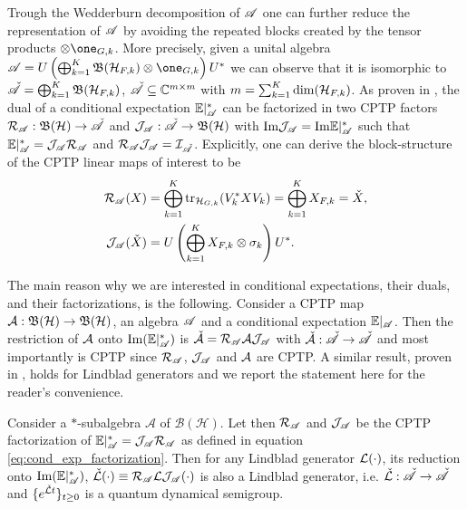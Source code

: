 \documentclass[aihp,12pt]{imsart}
\begin{document}
Trough the Wedderburn decomposition of $\mathscr{A}$ one can further reduce the representation of $\mathscr{A}$ by avoiding the repeated blocks created by the tensor products $\otimes\one_{G,k}$. More precisely, given a unital algebra $\As= U\left(\bigoplus_{k=1}^K \Bf(\Hc_{F,k}) \otimes \one_{G,k}\right)U^*$ 
we can observe that it is isomorphic to $\check{\mathscr{A}} = \bigoplus_{k=1}^K \mathfrak{B}(\mathcal{H}_{F,k})$, $\check{\mathscr{A}}\subseteq \mathbb{C}^{m\times m}$ with $m=\sum_{k=1}^K \dim(\mathcal{H}_{F,k})$. 
As proven in \cite[Theorem 1]{tit2023}, the dual of a conditional expectation $\mathbb{E}|_{\mathscr{A}}^*$ can be factorized in two CPTP factors $\mathcal{R}_{\mathscr{A}}:\mathfrak{B}(\mathcal{H})\to\check{\mathscr{A}}$ and $\mathcal{J}_{\mathscr{A}}: \check{\mathscr{A}}\to\mathfrak{B}(\mathcal{H})$ with ${\rm Im}\mathcal{J}_{\mathscr{A}} = {\rm Im}\mathbb{E}|_{\mathscr{A}}^*$ such that $\mathbb{E}|_{\mathscr{A}}^* = \mathcal{J}_{\mathscr{A}}\mathcal{R}_{\mathscr{A}}$ and $\mathcal{R}_{\mathscr{A}}\mathcal{J}_{\mathscr{A}} = \mathcal{I}_{\check{\mathscr{A}}}$.
Explicitly, one can derive the block-structure of the CPTP  linear maps of interest to be 
\begin{equation}
\begin{split}
    \mathcal{R}_{\mathscr{A}}(X) &=\bigoplus_{k=1}^K {\rm tr}_{\mathcal{H}_{G,k}}(V_k^* X V_k)=\bigoplus_{k=1}^K X_{F,k}=\check X,\\
    \mathcal{J}_{\mathscr{A}}(\check X)&=U\left(\bigoplus_{k=1}^K X_{F,k} \otimes\sigma_{k}\right)U^*.
\end{split}
    \label{eq:cond_exp_factorization}
\end{equation}

The main reason why we are interested in conditional expectations, their duals, and their factorizations, is the following. Consider a CPTP map $\mathcal{A}:\mathfrak{B}(\mathcal{H})\to\mathfrak{B}(\mathcal{H})$, an algebra $\mathscr{A}$ and a conditional expectation $\mathbb{E}|_{\mathscr{A}}$. Then the restriction of $\mathcal{A}$ onto ${\rm Im}(\mathbb{E}|_{\mathscr{A}}^*)$ is $\check{\mathcal{A}} = \mathcal{R}_{\mathscr{A}}  \mathcal{A}  \mathcal{J}_{\mathscr{A}}$ with $\check{\mathcal{A}}:\check{\mathscr{A}}\to\check{\mathscr{A}}$ and most importantly is CPTP since $\mathcal{R}_{\mathscr{A}}$, $\mathcal{J}_{\mathscr{A}}$ and $\mathcal{A}$ are CPTP. A similar result, proven in \cite{prxq2024}, holds for Lindblad generators and we report the statement here for the reader's convenience.

\begin{theorem}
\label{thm:Lindblad reduction}
 Consider a $*$-subalgebra $\mathscr{A}$ of $\mathcal{B(H)}.$ 
 Let then $\mathcal{R}_{\mathscr{A}}$ and $\mathcal{J}_{\mathscr{A}}$ be the CPTP factorization of $\mathbb{E}|_\mathscr{A}^* = \mathcal{J}_{\mathscr{A}}\mathcal{R}_{\mathscr{A}}$ as defined in equation \eqref{eq:cond_exp_factorization}. 
 Then for any Lindblad generator $\mathcal{L}(\cdot)$, its reduction onto ${\rm Im}(\mathbb{E}|_{\mathscr{A}}^*)$, $\check{\mathcal{L}}(\cdot)\equiv\mathcal{R}_{\mathscr{A}}\mathcal{L}\mathcal{J}_{\mathscr{A}}(\cdot)$ is also a Lindblad generator, i.e. $\check{\mathcal{L}}:\check{\mathscr{A}}\to\check{\mathscr{A}}$ and $\{e^{\check{\mathcal{L}}t}\}_{t\geq 0}$ is a quantum dynamical semigroup. 
\end{theorem}
\end{document}
